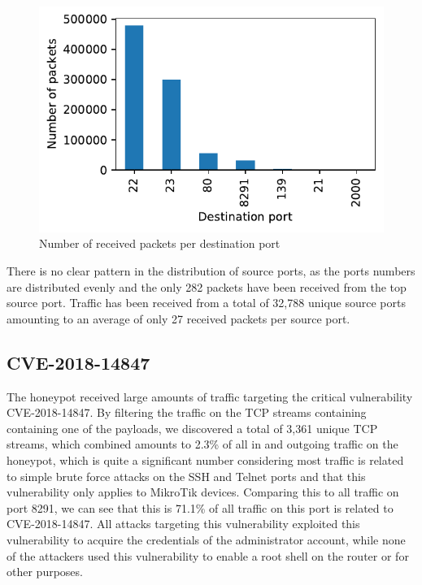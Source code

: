 \begin{figure}[ht]
    \includegraphics[width=\linewidth]{images/dest_port_packet_graph.pdf}
    \caption{Number of received packets per destination port}
    \label{fig:dest_port_graph}
\end{figure}

There is no clear pattern in the distribution of source ports, as the ports numbers are distributed evenly and the only 282 packets have been received from the top source port. Traffic has been received from a total of 32,788 unique source ports amounting to an average of only 27 received packets per source port.

\subsection{CVE-2018-14847}
The honeypot received large amounts of traffic targeting the critical vulnerability CVE-2018-14847. By filtering the traffic on the TCP streams containing containing one of the payloads, we discovered a total of 3,361 unique TCP streams, which combined amounts to 2.3\% of all in and outgoing traffic on the honeypot, which is quite a significant number considering most traffic is related to simple brute force attacks on the SSH and Telnet ports and that this vulnerability only applies to MikroTik devices. Comparing this to all traffic on port 8291, we can see that this is 71.1\% of all traffic on this port is related to CVE-2018-14847. All attacks targeting this vulnerability exploited this vulnerability to acquire the credentials of the administrator account, while none of the attackers used this vulnerability to enable a root shell on the router or for other purposes.

